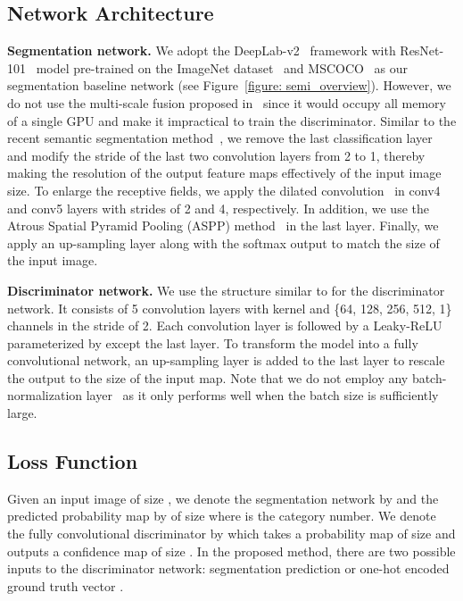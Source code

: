 \documentclass{bmvc2k}
\begin{document}
\subsection{Network Architecture}
	\vspace{-2mm}		
	{\flushleft \bf Segmentation network.}
We adopt the DeepLab-v2~\cite{deeplab} framework with ResNet-101~\cite{resnet} model pre-trained on the ImageNet dataset~\cite{imagenet} and MSCOCO~\cite{lin2014microsoft} as our segmentation baseline network 
	(see Figure~\ref{figure: semi_overview}).
However, we do not use the multi-scale fusion proposed in~\cite{deeplab} since it 
	would occupy all memory of a single GPU and make it impractical 
	to train the discriminator.
Similar to the recent semantic segmentation method~\cite{deeplab,dilated}, we remove the last classification layer and modify the stride of the last two convolution layers from 2 to 1,
	thereby making the resolution of the output feature maps effectively   
	of the input image size.
To enlarge the receptive fields, we apply the dilated convolution~\cite{dilated} in conv4 and conv5 layers with strides of 2 and 4, respectively.
In addition, we use the Atrous Spatial Pyramid Pooling (ASPP) method~\cite{deeplab} in the last layer. 
Finally, we apply an up-sampling layer along with the softmax output to match the size of the input image.
	
	\vspace{-2mm}	
	{\flushleft \bf Discriminator network.}
We use the structure similar to \cite{dcgan} for the discriminator network.
It consists of 5 convolution layers with  kernel and \{64, 128, 256, 512, 1\} channels in the stride of 2. 
Each convolution layer is followed by a Leaky-ReLU~\cite{maas2013rectifier} parameterized by  except the last layer.
To transform the model into a fully convolutional network, an up-sampling layer is added to the last layer to rescale the output to the size of the input map.
Note that we do not employ any batch-normalization layer~\cite{ioffe2015batch} as it only performs well when the batch size is sufficiently large. 


	\vspace{-2mm}
	\subsection{Loss Function}
	\label{section: training}


	Given an input image  of size , we denote the segmentation network by  and the predicted probability map by  of size  where  is the category number.
We denote the fully convolutional discriminator by  which takes a probability map 
	of  size  and outputs a confidence map of size . 
In the proposed method, there are two possible inputs to the discriminator network: 
	segmentation prediction  or one-hot encoded ground truth vector 
	.
	
\end{document}
